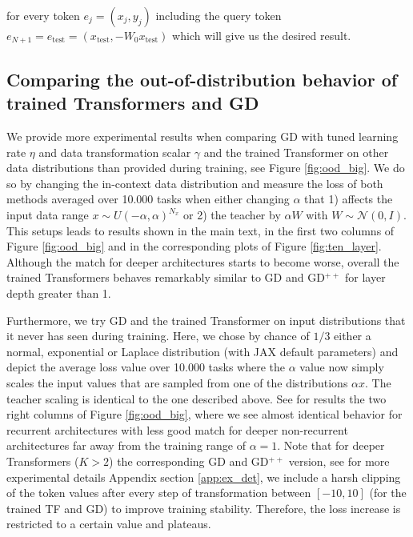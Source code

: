 \documentclass{article}
\theoremstyle{plain}
\theoremstyle{definition}
\theoremstyle{remark}
\begin{document}
for every token $e_j = (x_j, y_j)$ including the query token $e_{N+1} = e_{\text{test}} = (x_{\text{test}}, -W_0 x_{\text{test}})$ which will give us the desired result.

\subsection{Comparing the out-of-distribution behavior of trained Transformers and GD}

We provide more experimental results when comparing GD with tuned learning rate $\eta$ and data transformation scalar $\gamma$ 
and the trained Transformer on other data distributions than provided during training, see Figure \ref{fig:ood_big}. We do so by changing the in-context data distribution and measure the loss of both methods
averaged over 10.000 tasks when either changing  $\alpha$ that 1) affects the input data range $x \sim U(-\alpha, \alpha)^{N_x}$ or 2) the teacher by $\alpha W$ with $W \sim \mathcal{N}(0, I)$. This setups leads to results shown in the main text, in the first two columns of Figure \ref{fig:ood_big} and in the corresponding plots of Figure \ref{fig:ten_layer}. Although the match for deeper architectures starts to become worse, overall the trained Transformers behaves remarkably similar to GD and GD$^{++}$ for layer depth greater than 1. 

Furthermore, we try GD and the trained Transformer on input distributions that it never has seen during training. Here, we chose by chance of $1/3$ either a normal, exponential or Laplace distribution (with JAX default parameters) and depict the average loss value over 10.000 tasks where the $\alpha$ value now simply scales the input values that are sampled from one of the distributions $\alpha x$. The teacher scaling is identical to the one described above. See for results the two right columns of Figure \ref{fig:ood_big}, where we see almost identical behavior for recurrent architectures with less good match for deeper non-recurrent architectures far away from the training range of $\alpha = 1$.
Note that for deeper Transformers ($K>2$) the corresponding GD and GD$^{++}$ version, see for more experimental details Appendix section \ref{app:ex_det}, we include a harsh clipping of the token values after every step of transformation between $[-10, 10]$ (for the trained TF and GD) to improve training stability. Therefore, the loss increase is restricted to a certain value and plateaus.
\end{document}
